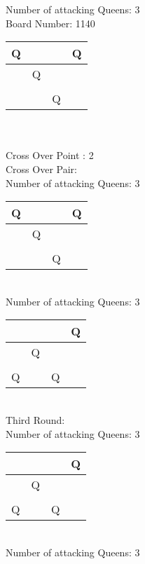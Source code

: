 \documentclass[a4paper,10pt]{article}
\begin{document}
\begin{flushleft}
\begin{flushleft}
\begin{flushleft}
\begin{flushleft}
\begin{flushleft}
\begin{flushleft}
\begin{flushleft}
\begin{flushleft}
\begin{flushleft}
\begin{flushleft}
\begin{flushleft}
\begin{flushleft}
\begin{flushleft}
\begin{flushleft}
\begin{flushleft}
\begin{flushleft}
\begin{flushleft}
\begin{flushleft}
Number of attacking Queens: 3\\
Board Number: 1140\\
\vspace{5mm}
    \begin{tabular}{| l | l | l | l |}
    \hline
     Q & & & Q \\ \hline
     & Q& & \\ \hline
     & & & \\ \hline
     & & Q & \\ \hline
    \end{tabular}
\break
\\
\\
Cross Over Point : 2\\
Cross Over Pair: \\
Number of attacking Queens: 3\\
\vspace{5mm}
    \begin{tabular}{| l | l | l | l |}
    \hline
     Q & & & Q \\ \hline
     & Q& & \\ \hline
     & & & \\ \hline
     & & Q & \\ \hline
    \end{tabular}
\break
\\
Number of attacking Queens: 3\\
\vspace{5mm}
    \begin{tabular}{| l | l | l | l |}
    \hline
     & & & Q\\ \hline
     & Q & & \\ \hline
     & & & \\ \hline
     Q & & Q & \\ \hline
    \end{tabular}
\\
Third Round:\\
Number of attacking Queens: 3\\
\vspace{5mm}
    \begin{tabular}{| l | l | l | l |}
    \hline
     & & & Q\\ \hline
     & Q & & \\ \hline
     & & & \\ \hline
     Q & & Q & \\ \hline
    \end{tabular}
\break
\\
Number of attacking Queens: 3\\

\end{flushleft}
\end{flushleft}
\end{flushleft}
\end{flushleft}
\end{flushleft}
\end{flushleft}
\end{flushleft}
\end{flushleft}
\end{flushleft}
\end{flushleft}
\end{flushleft}
\end{flushleft}
\end{flushleft}
\end{flushleft}
\end{flushleft}
\end{flushleft}
\end{flushleft}
\end{flushleft}
\end{document}
